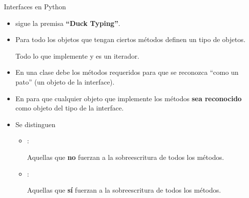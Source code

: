 \documentclass[10pt, envcountsect , spanish]{beamer}
\begin{document}
\begin{frame}{Interfaces en Python} 

\begin{itemize}
\item {} sigue la premisa \textbf{``Duck Typing''}.

\item Para  todo los objetos que tengan ciertos métodos definen un tipo de objetos.

\unEjemplo Todo lo que implemente  y  es un iterador.


\item En  una clase debe  los métodos requeridos para que se reconozca ``como un pato'' (un objeto de la interface).

\item En   para que cualquier objeto que implemente los métodos \textbf{sea reconocido} como objeto  del  tipo de la interface.

\item Se distinguen
\begin{itemize}
\item {}: 

\hfil Aquellas que \textbf{no} fuerzan a la sobreescritura de todos los métodos.


\item {}:  

\hfil Aquellas que \textbf{sí} fuerzan a la sobreescritura de todos los métodos.
\end{itemize}

\end{itemize}

\end{frame}
\end{document}
